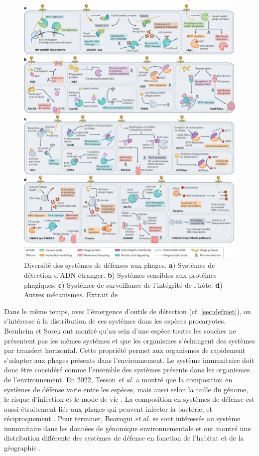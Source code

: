 \begin{figure}[htbp]
    \centering
    \includegraphics[width=\textwidth]{images/defensesys.png}
    \caption[Diversité des systèmes de défenses aux phages]{Diversité des systèmes de défenses aux phages. \textbf{a}) Systèmes de détection d'ADN étranger. \textbf{b}) Systèmes sensibles aux protéines phagiques. \textbf{c}) Systèmes de surveillance de l'intégrité de l'hôte. \textbf{d}) Autres mécanismes.  Extrait de \cite{georjon_highly_2023}}
    \label{fig:defsys}
\end{figure}

\newpage

Dans le même temps, avec l'émergence d'outils de détection (cf. \autoref{sec:defmet}), on s'intéresse à la distribution de ces systèmes dans les espèces procaryotes. Bernheim et Sorek \cite{bernheim_pan-immune_2020} ont montré qu'au sein d'une espèce toutes les souches ne présentent pas les mêmes systèmes et que les organismes s'échangent des systèmes par transfert horizontal. Cette propriété permet aux organismes de rapidement s'adapter aux phages présents dans l'environnement. Le système immunitaire doit donc être considéré comme l'ensemble des systèmes présents dans les organismes de l'environnement. En 2022, Tesson \textit{et al.} a montré que la composition en systèmes de défense varie entre les espèces, mais aussi selon la taille du génome, le risque d'infection et le mode de vie \cite{tesson_systematic_2022}. La composition en systèmes de défense est aussi étroitement liée aux phages qui peuvent infecter la bactérie, et réciproquement \cite{srikant_evolution_2022}. Pour terminer, Beavogui \textit{et al.} se sont intéressés au système immunitaire dans les données de génomique environnementale et ont montré une distribution différente des systèmes de défense en fonction de l'habitat et de la géographie \cite{beavogui_defensome_2024}.

